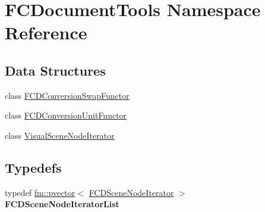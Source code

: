 \hypertarget{namespaceFCDocumentTools}{
\section{FCDocumentTools Namespace Reference}
\label{namespaceFCDocumentTools}
}
\subsection*{Data Structures}
\begin{DoxyCompactItemize}
\item 
class \hyperlink{classFCDocumentTools_1_1FCDConversionSwapFunctor}{FCDConversionSwapFunctor}
\item 
class \hyperlink{classFCDocumentTools_1_1FCDConversionUnitFunctor}{FCDConversionUnitFunctor}
\item 
class \hyperlink{classFCDocumentTools_1_1VisualSceneNodeIterator}{VisualSceneNodeIterator}
\end{DoxyCompactItemize}
\subsection*{Typedefs}
\begin{DoxyCompactItemize}
\item 
\hypertarget{namespaceFCDocumentTools_ade2a8b1ea2575945bed961f23189568a}{
typedef \hyperlink{classfm_1_1pvector}{fm::pvector}$<$ \hyperlink{classFCDSceneNodeIteratorT}{FCDSceneNodeIterator} $>$ {\bfseries FCDSceneNodeIteratorList}}
\label{namespaceFCDocumentTools_ade2a8b1ea2575945bed961f23189568a}

\end{DoxyCompactItemize}
